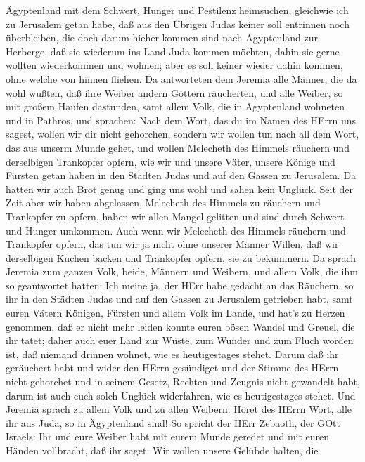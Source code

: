 Ägyptenland mit dem Schwert, Hunger und Pestilenz heimsuchen, gleichwie
ich zu Jerusalem getan habe,  daß aus den Übrigen Judas
keiner soll entrinnen noch überbleiben, die doch darum hieher kommen
sind nach Ägyptenland zur Herberge, daß sie wiederum ins Land Juda
kommen möchten, dahin sie gerne wollten wiederkommen und wohnen; aber es
soll keiner wieder dahin kommen, ohne welche von hinnen fliehen.
 Da antworteten dem Jeremia alle Männer, die da wohl
wußten, daß ihre Weiber andern Göttern räucherten, und alle Weiber, so
mit großem Haufen dastunden, samt allem Volk, die in Ägyptenland
wohneten und in Pathros, und sprachen:  Nach dem Wort, das
du im Namen des HErrn uns sagest, wollen wir dir nicht gehorchen,
 sondern wir wollen tun nach all dem Wort, das aus unserm
Munde gehet, und wollen Melecheth des Himmels räuchern und derselbigen
Trankopfer opfern, wie wir und unsere Väter, unsere Könige und Fürsten
getan haben in den Städten Judas und auf den Gassen zu Jerusalem. Da
hatten wir auch Brot genug und ging uns wohl und sahen kein Unglück.
 Seit der Zeit aber wir haben abgelassen, Melecheth des
Himmels zu räuchern und Trankopfer zu opfern, haben wir allen Mangel
gelitten und sind durch Schwert und Hunger umkommen.  Auch
wenn wir Melecheth des Himmels räuchern und Trankopfer opfern, das tun
wir ja nicht ohne unserer Männer Willen, daß wir derselbigen Kuchen
backen und Trankopfer opfern, sie zu bekümmern.  Da sprach
Jeremia zum ganzen Volk, beide, Männern und Weibern, und allem Volk, die
ihm so geantwortet hatten:  Ich meine ja, der HErr habe
gedacht an das Räuchern, so ihr in den Städten Judas und auf den Gassen
zu Jerusalem getrieben habt, samt euren Vätern Königen, Fürsten und
allem Volk im Lande, und hat's zu Herzen genommen,  daß er
nicht mehr leiden konnte euren bösen Wandel und Greuel, die ihr tatet;
daher auch euer Land zur Wüste, zum Wunder und zum Fluch worden ist, daß
niemand drinnen wohnet, wie es heutigestages stehet.  Darum
daß ihr geräuchert habt und wider den HErrn gesündiget und der Stimme
des HErrn nicht gehorchet und in seinem Gesetz, Rechten und Zeugnis
nicht gewandelt habt, darum ist auch euch solch Unglück widerfahren, wie
es heutigestages stehet.  Und Jeremia sprach zu allem Volk
und zu allen Weibern: Höret des HErrn Wort, alle ihr aus Juda, so in
Ägyptenland sind!  So spricht der HErr Zebaoth, der GOtt
Israels: Ihr und eure Weiber habt mit eurem Munde geredet und mit euren
Händen vollbracht, daß ihr saget: Wir wollen unsere Gelübde halten, die
